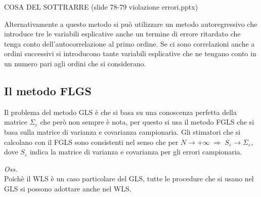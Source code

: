 \documentclass[]{article}
\begin{document}
COSA DEL SOTTRARRE (slide 78-79 violazione errori.pptx)

Alternativamente a questo metodo si può utilizzare un metodo autoregressivo che introduce tre le variabili esplicative anche un termine di errore ritardato che tenga conto dell'autocorrelazione al primo ordine. Se ci sono correlazioni anche a ordini successivi si introducono tante variabili esplicative che ne tengano conto in un numero pari agli ordini che si considerano.

\subsection{Il metodo FLGS}
Il problema del metodo GLS è che si basa su una conoscenza perfetta della matrice $\Sigma_\varepsilon$ che però non sempre è nota, per questo si usa il metodo FGLS che si basa sulla matrice di varianza e covarianza campionaria. Gli stimatori che si calcolano con il FGLS sono consistenti nel senso che per $N \rightarrow +\infty \; \Rightarrow \; S_\varepsilon \rightarrow \Sigma_\varepsilon$, dove $S_\varepsilon$ indica la matrice di varianza e covarianza per gli errori campionaria.


\textit{Oss.}\\
Poichè il WLS è un caso particolare del GLS, tutte le procedure che si usano nel GLS si possono adottare anche nel WLS.
\end{document}
